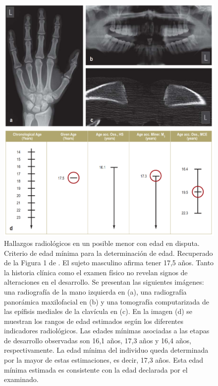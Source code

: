 \begin{figure}[H]
    \centering
    \includegraphics[width=\textwidth]{capitulos/cap_03/imagenes/X_ray_images.png}
    \caption[
        Hallazgos radiológicos en un posible menor con edad disputada: criterio de edad mínima para la determinación de edad. 
        Recuperado de la Figura 1 de \cite{schmeling2016}. 
    ]{
        Hallazgos radiológicos en un posible menor con edad en disputa. Criterio de edad mínima para la determinación de edad. 
        Recuperado de la Figura 1 de \cite{schmeling2016}. 
        El sujeto masculino afirma tener 17,5 años. Tanto la historia clínica como el examen físico no revelan signos de alteraciones en el desarrollo. Se presentan las siguientes imágenes: una radiografía de la mano izquierda en (a), una radiografía panorámica maxilofacial en (b) y una tomografía computarizada de las epífisis mediales de la clavícula en (c). En la imagen (d) se muestran los rangos de edad estimados según los diferentes indicadores radiológicos. Las edades mínimas asociadas a las etapas de desarrollo observadas son 16,1 años, 17,3 años y 16,4 años, respectivamente. La edad mínima del individuo queda determinada por la mayor de estas estimaciones, es decir, 17,3 años. Esta edad mínima estimada es consistente con la edad declarada por el examinado.
    }
    \label{fig:x_ray_images}
\end{figure}

